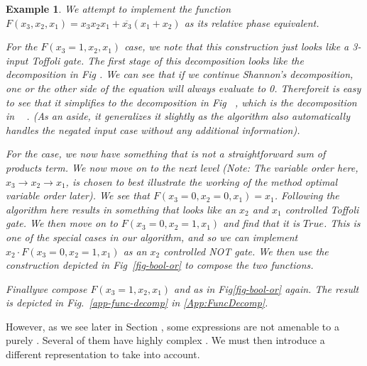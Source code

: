 \documentclass[paper]{ieice}
\newtheorem{example}{Example}
\providecommand{\DIFadd}[1]{{\protect\color{blue}{#1}}} %
\providecommand{\DIFaddbegin}{} %
\providecommand{\DIFaddend}{} %
\newcommand{\DIFaddincludegraphics}[2][]{{\color{blue}\fbox{\DIFOincludegraphics[#1]{#2}}}} %
\DeclareRobustCommand{\DIFaddbegin}{\DIFOaddbegin \let\includegraphics\DIFaddincludegraphics} %
\DeclareRobustCommand{\DIFaddend}{\DIFOaddend \let\includegraphics\DIFOincludegraphics} %
\begin{document}
\begin{example}
  \label{ex-bool}
  We attempt to implement the function $F(x_3,x_2,x_1) = x_3x_2x_1 + \overline{x_3}(x_1 + x_2)$ as its relative phase equivalent.

  For the $F(x_3 = 1,x_2,x_1)$ case, we note that this construction just looks like a 3-input Toffoli gate. The first stage of this decomposition looks  \DIFaddbegin \DIFadd{exactly }\DIFaddend like the decomposition in Fig \DIFaddbegin \DIFadd{.~\ref{fig-rtof} }\DIFaddend . We can see that if we continue Shannon's decomposition, one or the other side of the equation will always evaluate to 0. Therefore\DIFaddbegin \DIFadd{, }\DIFaddend it is easy to see that it simplifies to the
  decomposition in Fig~ \DIFaddbegin \DIFadd{\ref{fig-f-dot-g} }\DIFaddend , which is the decomposition in ~ \DIFaddbegin \DIFadd{\mbox{%
\cite{bib-amy-phase-state}}\hskip0pt%
 }\DIFaddend .
  (As an aside, it generalizes it slightly as the algorithm also automatically handles the negated input
  case without any additional information). %

  For the  \DIFaddbegin \DIFadd{$F(x_3 = 0,x_2,x_1)$ }\DIFaddend case, we now have something that is not a straightforward sum of products term.
  We now move on to the next level (Note: The variable order here, $x_3 \rightarrow x_2 \rightarrow x_1$, is chosen to best illustrate the working of the method \DIFaddbegin \DIFadd{; we will treat the }\DIFaddend optimal variable order later). We see that $F(x_3 = 0,x_2=0,x_1) = x_1$. Following the algorithm here results in something that looks like an $x_2$
  and $x_1$ controlled Toffoli gate. We then move on to $F(x_3 = 0,x_2=1,x_1)$ and find that it is $True$.
  This is one of the special cases in our algorithm, and so we can implement $x_2 \cdot F(x_3 = 0,x_2=1,x_1)$
  as an $x_2$ controlled NOT gate. We then use the construction depicted in Fig~\ref{fig-bool-or} to compose
  the two functions. %

  Finally\DIFaddbegin \DIFadd{, }\DIFaddend we compose $F(x_3 = 1,x_2,x_1)$ and  \DIFaddbegin \DIFadd{$F(x_3 = 0,x_2,x_1)$ }\DIFaddend as in Fig\DIFaddbegin \DIFadd{. }\DIFaddend \ref{fig-bool-or} again. The result is depicted in Fig.~\ref{app-func-decomp} in \ref{App:FuncDecomp}.
\end{example}

However, as we  \DIFaddbegin \DIFadd{shall }\DIFaddend see later in Section  \DIFaddbegin \DIFadd{\ref{Sec:exp} }\DIFaddend , some expressions are not amenable to a purely  \DIFaddbegin \DIFadd{Shannon-based
decomposition }\DIFaddend . Several of them have highly complex  \DIFaddbegin \DIFadd{representations through Shannon's decomposition }\DIFaddend .
We must then introduce a different representation to take  \DIFaddbegin \DIFadd{these }\DIFaddend into account.
\end{document}
